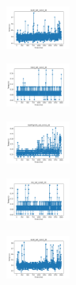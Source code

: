 \begin{figure}[H]
\begin{subfigure}
    \end{subfigure}
    \hfill
    \begin{subfigure}
        \centering
        \includegraphics[width=0.234\textwidth]{img/aggun/ecoli_set_const_20_589741062_time.png}
    \end{subfigure}
    \hfill
    \begin{subfigure}
        \centering
        \includegraphics[width=0.234\textwidth]{img/aggun/rand_set_const_20_589741062_time.png}
    \end{subfigure}
    \hfill
    \begin{subfigure}
        \centering
        \includegraphics[width=0.234\textwidth]{img/aggun/newthyroid_set_const_20_589741062_time.png}
    \end{subfigure}
    \hfill
    \begin{subfigure}
        \centering
        \includegraphics[width=0.234\textwidth]{img/aggun/iris_set_const_20_277451237_time.png}
    \end{subfigure}
    \hfill
    \begin{subfigure}
        \centering
        \includegraphics[width=0.234\textwidth]{img/aggun/ecoli_set_const_20_277451237_time.png}
    \end{subfigure}
    \hfill

\end{figure}
